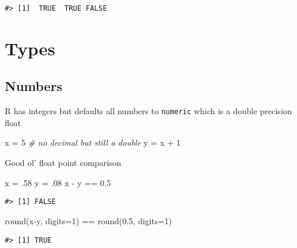 \documentclass[
]{book}
\newenvironment{Shaded}{\begin{snugshade}}{\end{snugshade}}
\newcommand{\AttributeTok}[1]{\textcolor[rgb]{0.77,0.63,0.00}{#1}}
\newcommand{\CommentTok}[1]{\textcolor[rgb]{0.56,0.35,0.01}{\textit{#1}}}
\newcommand{\DecValTok}[1]{\textcolor[rgb]{0.00,0.00,0.81}{#1}}
\newcommand{\FloatTok}[1]{\textcolor[rgb]{0.00,0.00,0.81}{#1}}
\newcommand{\FunctionTok}[1]{\textcolor[rgb]{0.00,0.00,0.00}{#1}}
\newcommand{\NormalTok}[1]{#1}
\newcommand{\OtherTok}[1]{\textcolor[rgb]{0.56,0.35,0.01}{#1}}
\newcommand{\SpecialCharTok}[1]{\textcolor[rgb]{0.00,0.00,0.00}{#1}}
\begin{document}
\begin{verbatim}
#> [1]  TRUE  TRUE FALSE
\end{verbatim}

\hypertarget{types}{%
\chapter{Types}\label{types}}

\hypertarget{numbers}{%
\section{Numbers}\label{numbers}}

R has integers but defaults all numbers to \texttt{numeric} which is a double precision float

\begin{Shaded}
\begin{Highlighting}[]
\NormalTok{x }\OtherTok{=} \DecValTok{5} \CommentTok{\# no decimal but still a double}
\NormalTok{y }\OtherTok{=}\NormalTok{ x }\SpecialCharTok{+} \DecValTok{1}
\end{Highlighting}
\end{Shaded}

Good ol' float point comparison

\begin{Shaded}
\begin{Highlighting}[]
\NormalTok{x }\OtherTok{=}\NormalTok{ .}\DecValTok{58}
\NormalTok{y }\OtherTok{=}\NormalTok{ .}\DecValTok{08}
\NormalTok{x }\SpecialCharTok{{-}}\NormalTok{ y }\SpecialCharTok{==} \FloatTok{0.5}
\end{Highlighting}
\end{Shaded}

\begin{verbatim}
#> [1] FALSE
\end{verbatim}

\begin{Shaded}
\begin{Highlighting}[]
\FunctionTok{round}\NormalTok{(x}\SpecialCharTok{{-}}\NormalTok{y, }\AttributeTok{digits=}\DecValTok{1}\NormalTok{) }\SpecialCharTok{==} \FunctionTok{round}\NormalTok{(}\FloatTok{0.5}\NormalTok{, }\AttributeTok{digits=}\DecValTok{1}\NormalTok{)}
\end{Highlighting}
\end{Shaded}

\begin{verbatim}
#> [1] TRUE
\end{verbatim}
\end{document}
